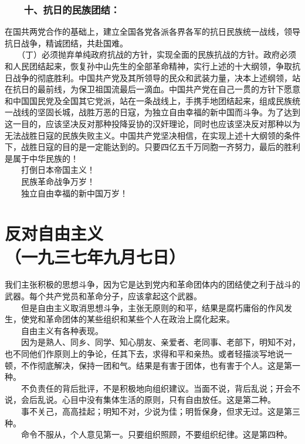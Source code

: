 \documentclass[cn,11pt,chinese]{elegantbook}
\def\myformat#1{\hfil\hfil #1}
\begin{document}
\subsubsection*{\myformat{　　十、抗日的民族团结：}}
在国共两党合作的基础上，建立全国各党各派各界各军的抗日民族统一战线，领导抗日战争，精诚团结，共赴国难。\\
　　（丁）必须抛弃单纯政府抗战的方针，实现全面的民族抗战的方针。政府必须和人民团结起来，恢复孙中山先生的全部革命精神，实行上述的十大纲领，争取抗日战争的彻底胜利。中国共产党及其所领导的民众和武装力量，决本上述纲领，站在抗日的最前线，为保卫祖国流最后一滴血。中国共产党在自己一贯的方针下愿意和中国国民党及全国其它党派，站在一条战线上，手携手地团结起来，组成民族统一战线的坚固长城，战胜万恶的日寇，为独立自由幸福的新中国而斗争。为了达到这一目的，应该坚决反对那种投降妥协的汉奸理论，同时也应该坚决反对那种以为无法战胜日寇的民族失败主义。中国共产党坚决相信，在实现上述十大纲领的条件下，战胜日寇的目的是一定能达到的。只要四亿五千万同胞一齐努力，最后的胜利是属于中华民族的！\\
　　打倒日本帝国主义！\\
　　民族革命战争万岁！\\
　　独立自由幸福的新中国万岁！\\
\newpage\section*{\myformat{反对自由主义}\\\myformat{（一九三七年九月七日）}}
我们主张积极的思想斗争，因为它是达到党内和革命团体内的团结使之利于战斗的武器。每个共产党员和革命分子，应该拿起这个武器。\\
　　但是自由主义取消思想斗争，主张无原则的和平，结果是腐朽庸俗的作风发生，使党和革命团体的某些组织和某些个人在政治上腐化起来。\\
　　自由主义有各种表现。\\
　　因为是熟人、同乡、同学、知心朋友、亲爱者、老同事、老部下，明知不对，也不同他们作原则上的争论，任其下去，求得和平和亲热。或者轻描淡写地说一顿，不作彻底解决，保持一团和气。结果是有害于团体，也有害于个人。这是第一种。\\
　　不负责任的背后批评，不是积极地向组织建议。当面不说，背后乱说；开会不说，会后乱说。心目中没有集体生活的原则，只有自由放任。这是第二种。\\
　　事不关己，高高挂起；明知不对，少说为佳；明哲保身，但求无过。这是第三种。\\
　　命令不服从，个人意见第一。只要组织照顾，不要组织纪律。这是第四种。\\
\end{document}
